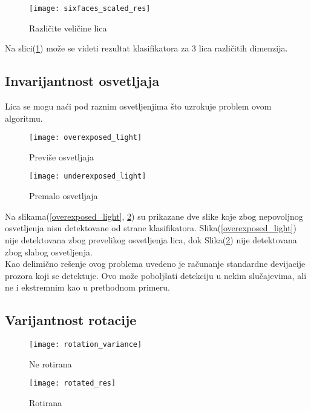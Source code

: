 \begin{figure}[h]
  \centering
  \texttt{[image: sixfaces\_scaled\_res]}
  \caption{Različite veličine lica}
  \label{sixfaces_scaled}
\end{figure}

Na slici(\ref{sixfaces_scaled}) može se videti rezultat klasifikatora za 3 lica
različitih dimenzija. \\

\newpage

\subsection{Invarijantnost osvetljaja}

Lica se mogu naći pod raznim osvetljenjima što uzrokuje problem ovom algoritmu.


\begin{figure}[!htb]
\centering
\parbox{6cm}{
\texttt{[image: overexposed\_light]}
\caption{Previše osvetljaja\cite{CALTECH_DATASET}}
\label{overexposed_light}}
\qquad
\begin{minipage}{6cm}
\texttt{[image: underexposed\_light]}
\caption{Premalo osvetljaja\cite{CALTECH_DATASET}}
\label{underexposed_light}
\end{minipage}
\end{figure}

Na slikama(\ref{overexposed_light}, \ref{underexposed_light}) su prikazane dve
slike koje zbog nepovoljnog osvetljenja nisu detektovane od strane
klasifikatora.
Slika(\ref{overexposed_light}) nije detektovana zbog prevelikog osvetljenja
lica, dok Slika(\ref{underexposed_light}) nije detektovana zbog slabog
osvetljenja.  \\

Kao delimično rešenje ovog problema uvedeno je računanje standardne devijacije
prozora koji se detektuje.
Ovo može poboljšati detekciju u nekim slučajevima, ali ne i ekstremnim kao u
prethodnom primeru.

\subsection{Varijantnost rotacije}

\begin{figure}[!htb]
\centering
\parbox{6cm}{
\texttt{[image: rotation\_variance]}
\caption{Ne rotirana\cite{CALTECH_DATASET}}
\label{rotation_variance}}
\qquad
\begin{minipage}{6cm}
\texttt{[image: rotated\_res]}
\caption{Rotirana\cite{CALTECH_DATASET}}
\label{rotated_res}
\end{minipage}
\end{figure}